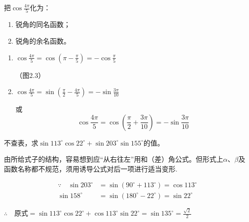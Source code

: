 \noindent
\begin{minipage}{.55\textwidth}
\begin{example}
把$\cos\frac{4\pi}{5}$化为：
\begin{enumerate}[(1)]
    \item 锐角的同名函数；
    \item 锐角的余名函数。
\end{enumerate}
\end{example}

\begin{solution}
\begin{enumerate}[(1)]
    \item $\cos\frac{4\pi}{5}=\cos\left(\pi-\frac{\pi}{5}\right)=-\cos\frac{\pi}{5}$
    
    （图2.3）
    \item $\cos\frac{4\pi}{5}=\sin\left(\frac{\pi}{2}-\frac{4\pi}{5}\right)=-\sin\frac{3\pi}{10}$
    
或
\[\cos\frac{4\pi}{5}=\cos\left(\frac{\pi}{2}+\frac{3\pi}{10}\right)=-\sin\frac{3\pi}{10}\]    
\end{enumerate}
\end{solution}    
\end{minipage}\hfill
\begin{minipage}{.35\textwidth}
\centering
{}
\end{minipage}

\begin{example}
    不查表，求$\sin113^{\circ}\cos22^{\circ}+\sin203^{\circ}\sin155^{\circ}$的值。
\end{example}

\begin{analyze}
由所给式子的结构，容易想到应“从右往左”用和（差）角公式。但形式上$\alpha$、$\beta$及函数名称都不规范，须用诱导公式对后一项进行适当变形.
\end{analyze}

\begin{solution}
\[\begin{split}
\because\quad \sin203^{\circ}&=\sin(90^{\circ}+113^{\circ})=\cos113^{\circ}\\
\sin 158^{\circ}&=\sin(180^{\circ}-22^{\circ})=\sin 22^{\circ}
\end{split}\]

$\therefore\quad \text{原式}=\sin113^{\circ}\cos22^{\circ}+\cos113^{\circ}\sin22^{\circ}=\sin135^{\circ}=\frac{\sqrt{2}}{2}$
\end{solution}

